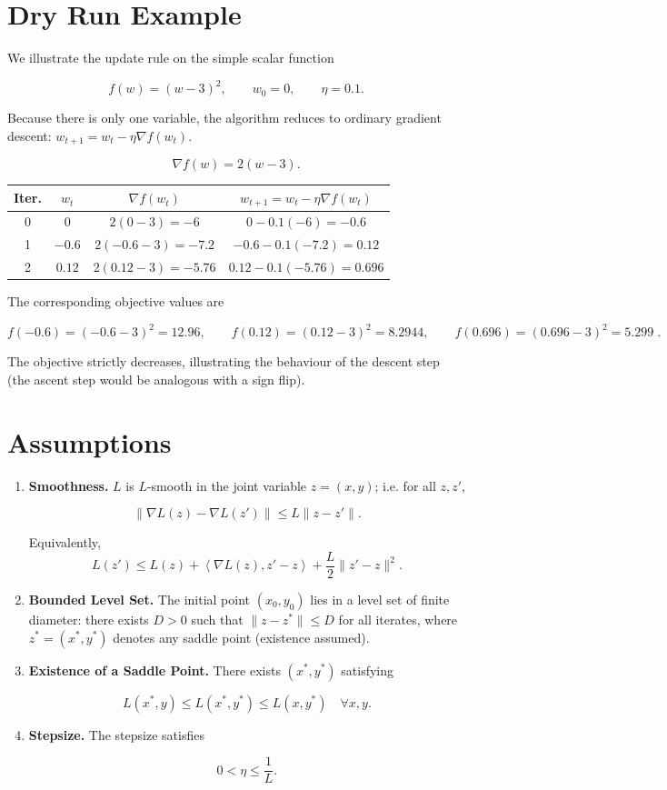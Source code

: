 \documentclass{article}
\newcommand{\inner}[2]{\left\langle #1,#2 \right\rangle}
\begin{document}
\section*{Dry Run Example}
We illustrate the update rule on the simple scalar function  

\[
f(w)= (w-3)^2 ,\qquad w_0=0,\qquad \eta =0.1 .
\]

Because there is only one variable, the algorithm reduces to ordinary gradient descent:
\(w_{t+1}=w_t-\eta \nabla f(w_t)\).

\[
\nabla f(w)=2(w-3).
\]

\begin{center}
\begin{tabular}{c|c|c|c}
\textbf{Iter.} & $w_t$ & $\nabla f(w_t)$ & $w_{t+1}=w_t-\eta\nabla f(w_t)$ \\ \hline
0 & $0$ & $2(0-3)=-6$ & $0-0.1(-6)= -0.6$ \\[4pt]
1 & $-0.6$ & $2(-0.6-3)=-7.2$ & $-0.6-0.1(-7.2)= 0.12$ \\[4pt]
2 & $0.12$ & $2(0.12-3)=-5.76$ & $0.12-0.1(-5.76)=0.696$ \\[4pt]
\end{tabular}
\end{center}

The corresponding objective values are  

\[
f(-0.6)= ( -0.6-3)^2 = 12.96,\qquad 
f(0.12)= (0.12-3)^2 = 8.2944,\qquad 
f(0.696)= (0.696-3)^2 = 5.299\; .
\]

The objective strictly decreases, illustrating the behaviour of the descent step (the ascent step would be analogous with a sign flip).

\newpage
\section*{Assumptions}
\begin{enumerate}[label=\textbf{A\arabic*:}, leftmargin=*]
\item \textbf{Smoothness.}  
\(L\) is \(L\)-smooth in the joint variable \(z=(x,y)\); i.e. for all \(z,z'\),

\[
\| \nabla L(z)-\nabla L(z')\| \le L\|z-z'\|.
\tag{A1}
\]

Equivalently,
\[
L(z')\le L(z)+\inner{\nabla L(z)}{z'-z}+\frac{L}{2}\|z'-z\|^{2}.
\tag{A1'}
\]

\item \textbf{Bounded Level Set.}  
The initial point \((x_0,y_0)\) lies in a level set of finite diameter:
there exists \(D>0\) such that \(\|z-z^*\|\le D\) for all iterates, where
\(z^*=(x^*,y^*)\) denotes any saddle point (existence assumed).

\item \textbf{Existence of a Saddle Point.}  
There exists \((x^*,y^*)\) satisfying  

\[
L(x^*,y)\le L(x^*,y^*)\le L(x,y^*)\quad\forall x,y .
\tag{A3}
\]

\item \textbf{Stepsize.}  
The stepsize satisfies  

\[
0<\eta\le \frac{1}{L}.
\tag{A4}
\]

\end{enumerate}
\end{document}
